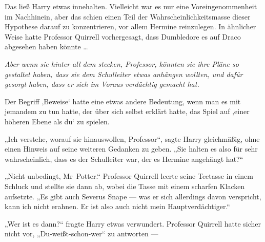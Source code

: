 Das ließ Harry etwas innehalten. Vielleicht war es nur eine Voreingenommenheit im Nachhinein, aber das schien einen Teil der Wahrscheinlichkeitsmasse dieser Hypothese darauf zu konzentrieren, vor allem Hermine reinzulegen. In ähnlicher Weise hatte Professor Quirrell vorhergesagt, dass Dumbledore es auf Draco abgesehen haben könnte …

\emph{Aber wenn sie hinter all dem stecken, Professor, könnten sie ihre Pläne so gestaltet haben, dass sie dem Schulleiter etwas anhängen wollten, und dafür gesorgt haben, dass er sich im Voraus verdächtig gemacht hat.}

Der Begriff ‚Beweise‘ hatte eine etwas andere Bedeutung, wenn man es mit jemandem zu tun hatte, der über sich selbst erklärt hatte, das Spiel auf ‚einer höheren Ebene als du‘ zu spielen.

„Ich verstehe, worauf sie hinauswollen, Professor“, sagte Harry gleichmäßig, ohne einen Hinweis auf seine weiteren Gedanken zu geben.
„Sie halten es also für sehr wahrscheinlich, dass es der Schulleiter war, der es Hermine angehängt hat?“

„Nicht unbedingt, Mr~Potter.“ Professor Quirrell leerte seine Teetasse in einem Schluck und stellte sie dann ab, wobei die Tasse mit einem scharfen Klacken aufsetzte.
„Es gibt auch Severus Snape — was er sich allerdings davon verspricht, kann ich nicht erahnen. Er ist also auch nicht mein Hauptverdächtiger.“

„Wer ist es dann?“ fragte Harry etwas verwundert. Professor Quirrell hatte sicher nicht vor,
„Du-weißt-schon-wer“ zu antworten —

